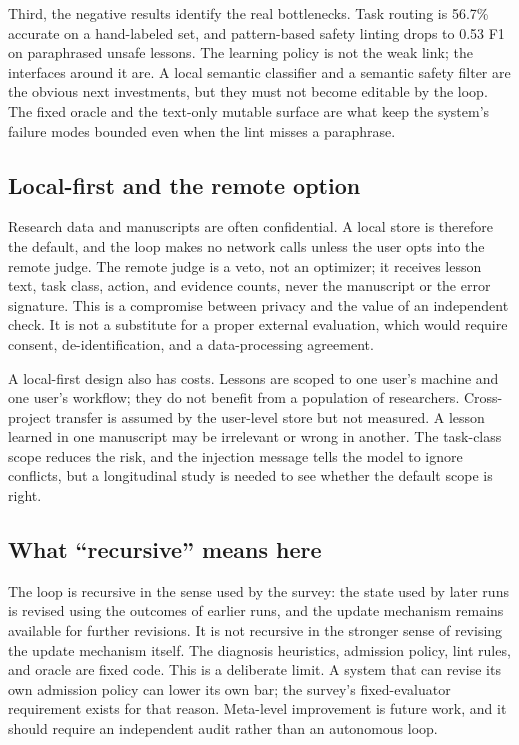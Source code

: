 Third, the negative results identify the real bottlenecks. Task routing is 56.7\% accurate on a hand-labeled set, and pattern-based safety linting drops to 0.53 F1 on paraphrased unsafe lessons. The learning policy is not the weak link; the interfaces around it are. A local semantic classifier and a semantic safety filter are the obvious next investments, but they must not become editable by the loop. The fixed oracle and the text-only mutable surface are what keep the system's failure modes bounded even when the lint misses a paraphrase.

\subsection{Local-first and the remote option}
Research data and manuscripts are often confidential. A local store is therefore the default, and the loop makes no network calls unless the user opts into the remote judge. The remote judge is a veto, not an optimizer; it receives lesson text, task class, action, and evidence counts, never the manuscript or the error signature. This is a compromise between privacy and the value of an independent check. It is not a substitute for a proper external evaluation, which would require consent, de-identification, and a data-processing agreement.

A local-first design also has costs. Lessons are scoped to one user's machine and one user's workflow; they do not benefit from a population of researchers. Cross-project transfer is assumed by the user-level store but not measured. A lesson learned in one manuscript may be irrelevant or wrong in another. The task-class scope reduces the risk, and the injection message tells the model to ignore conflicts, but a longitudinal study is needed to see whether the default scope is right.

\subsection{What ``recursive'' means here}
The loop is recursive in the sense used by the survey: the state used by later runs is revised using the outcomes of earlier runs, and the update mechanism remains available for further revisions. It is not recursive in the stronger sense of revising the update mechanism itself. The diagnosis heuristics, admission policy, lint rules, and oracle are fixed code. This is a deliberate limit. A system that can revise its own admission policy can lower its own bar; the survey's fixed-evaluator requirement exists for that reason. Meta-level improvement is future work, and it should require an independent audit rather than an autonomous loop.


